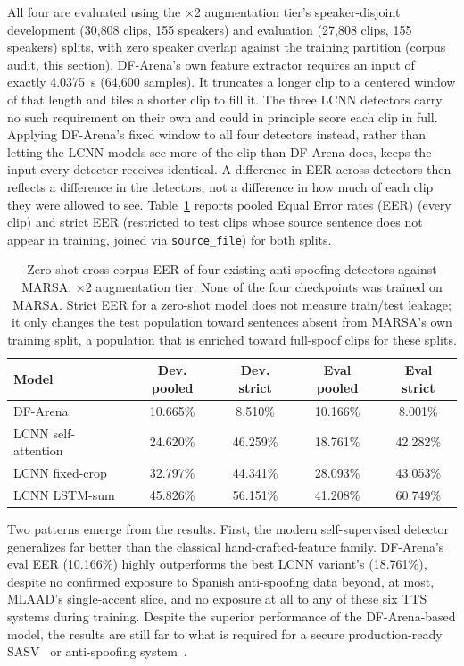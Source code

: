 \documentclass[11pt]{article}
\begin{document}
All four are evaluated using the $\times$2 augmentation tier's
speaker-disjoint development (30{,}808 clips, 155 speakers) and
evaluation (27{,}808 clips, 155 speakers) splits, with zero speaker
overlap against the training partition (corpus audit, this section).
DF-Arena's own feature extractor requires an input of exactly
\SI{4.0375}{\second} (64{,}600 samples). It truncates a longer clip to
a centered window of that length and tiles a shorter clip to fill it.
The three LCNN detectors carry no such requirement on their own and
could in principle score each clip in full. Applying DF-Arena's fixed
window to all four detectors instead, rather than letting the LCNN
models see more of the clip than DF-Arena does, keeps the input every
detector receives identical. A difference in EER across detectors then
reflects a difference in the detectors, not a difference in how much of
each clip they were allowed to see. Table~\ref{tab:baseline} reports pooled Equal Error rates (EER) (every
clip) and strict EER (restricted to test clips whose source sentence
does not appear in training, joined via \texttt{source\_file}) for both
splits.

\begin{table}[H]
\centering
\caption{Zero-shot cross-corpus EER of four existing anti-spoofing detectors against
MARSA, $\times$2 augmentation tier. None of the four checkpoints was
trained on MARSA. Strict EER for a zero-shot model does not measure
train/test leakage; it only changes the test population toward
sentences absent from MARSA's own training split, a population that is
enriched toward full-spoof clips for these splits.}
\label{tab:baseline}
\small
\begin{tabular}{lcccc}
\toprule
\textbf{Model} & \textbf{Dev. pooled} & \textbf{Dev. strict} & \textbf{Eval pooled} & \textbf{Eval strict} \\
\midrule
DF-Arena \citep{dowerah2025speechdfarena} & 10.665\% & 8.510\% & 10.166\% & 8.001\% \\
LCNN self-attention \citep{wang2021comparative} & 24.620\% & 46.259\% & 18.761\% & 42.282\% \\
LCNN fixed-crop \citep{wang2021comparative} & 32.797\% & 44.341\% & 28.093\% & 43.053\% \\
LCNN LSTM-sum \citep{wang2021comparative} & 45.826\% & 56.151\% & 41.208\% & 60.749\% \\
\bottomrule
\end{tabular}
\end{table}

Two patterns emerge from the results. First, the modern self-supervised detector
generalizes far better than the classical hand-crafted-feature family.
DF-Arena's eval EER (10.166\%) highly outperforms the best LCNN
variant's (18.761\%), despite no confirmed exposure to Spanish
anti-spoofing data beyond, at most, MLAAD's single-accent slice, and no
exposure at all to any of these six TTS systems during training.
Despite the superior performance of the DF-Arena-based model, the results are still far to what is required for a secure production-ready SASV~\citep{Wu2026wildspoof} or anti-spoofing system~\citep{dowerah2025speechdfarena}.
\end{document}
